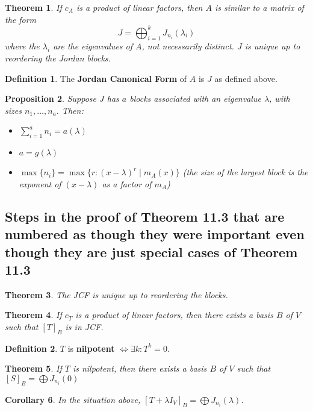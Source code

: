 \documentclass[12pt]{article}
\newtheorem{thm}{Theorem}[section]
\newtheorem{cor}[thm]{Corollary}
\newtheorem{prop}[thm]{Proposition}
\theoremstyle{definition}
\newtheorem*{defn*}{Definition}
\begin{document}
\begin{thm}
	If $c_A$ is a product of linear factors, then $A$ is similar to a matrix of the form
	$$J = \bigoplus_{i = 1}^kJ_{n_i}(\lambda_i)$$
	where the $\lambda_i$ are the eigenvalues of $A$, not necessarily distinct.
	$J$ is unique up to reordering the Jordan blocks.
\end{thm}

\begin{defn*}
	The \textbf{Jordan Canonical Form} of $A$ is $J$ as defined above.
\end{defn*}

\begin{prop}
	Suppose $J$ has $a$ blocks associated with an eigenvalue $\lambda$, with sizes $n_1, \ldots, n_a$.
	Then:
	\begin{itemize}
		\item $\sum_{i = 1}^an_i = a(\lambda)$
		\item $a = g(\lambda)$
		\item $\max{\{n_i\}} = \max{\{r : (x - \lambda)^r \mid m_A(x)\}}$ (the size of the largest block is the exponent of $(x - \lambda)$ as a factor of $m_A$)
	\end{itemize}
\end{prop}

\subsection{Steps in the proof of Theorem 11.3 that are numbered as though they were important even though they are just special cases of Theorem 11.3}

\begin{thm}
	The JCF is unique up to reordering the blocks.
\end{thm}

\begin{thm}
	If $c_T$ is a product of linear factors, then there exists a basis $B$ of $V$ such that $[T]_B$ is in JCF.
\end{thm}

\begin{defn*}
	$T$ is \textbf{nilpotent} $\iff \exists k : T^k = 0$.
\end{defn*}

\begin{thm}
	If $T$ is nilpotent, then there exists a basis $B$ of $V$ such that $[S]_B = \bigoplus J_{n_i}(0)$
\end{thm}

\begin{cor}
	In the situation above, $[T + \lambda I_V]_B = \bigoplus J_{n_i}(\lambda)$.
\end{cor}
\end{document}
